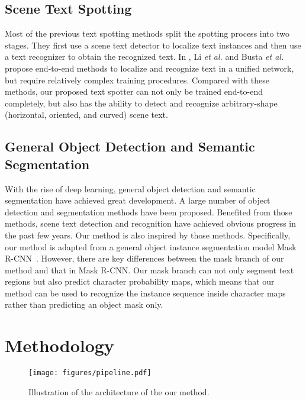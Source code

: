 \documentclass[runningheads]{llncs}
\begin{document}
\subsection{Scene Text Spotting}

Most of the previous text spotting methods \cite{jaderberg2016reading,liao2017textboxes,SynthText,liao2018textboxes++} split the spotting process into two stages. They first use a scene text detector \cite{jaderberg2016reading,liao2017textboxes,liao2018textboxes++} to localize text instances and then use a text recognizer \cite{Jaderberg14c,shi2017end} to obtain the recognized text. In \cite{Li_2017_ICCV,Busta_2017_ICCV}, Li \emph{et al.} and Busta \emph{et al.} propose end-to-end methods to localize and recognize text in a unified network, but require relatively complex training procedures. Compared with these methods, our proposed text spotter can not only be trained end-to-end completely, but also has the ability to detect and recognize  arbitrary-shape (horizontal, oriented, and curved) scene text.


\subsection{General Object Detection and Semantic Segmentation}

With the rise of deep learning, general object detection and semantic segmentation have achieved great development. A large number of object detection and segmentation  methods \cite{girshick2014rich,fastrcnn,ren2015faster,dai2016r,lin2017feature,liu2016ssd,redmon2016you,long2015fully,dai2016instance,li2017fully,he2017mask} have been proposed. Benefited from those methods, scene text detection and recognition have achieved obvious progress in the past few years. Our method is also inspired by those methods. Specifically, our method is adapted from a general object instance segmentation model Mask R-CNN~\cite{he2017mask}. However, there are key differences between the mask branch of our method and that in Mask R-CNN. Our mask branch can not only segment text regions but also predict character probability maps, which means that our method can be used to recognize the instance sequence inside character maps rather than predicting an object mask only.

\section{Methodology}
\begin{figure}[!b]
\begin{center}
\texttt{[image: figures/pipeline.pdf]}
\end{center}
\caption{Illustration of the architecture of the our method.}
\label{fig:pipeline}
\end{figure}
\end{document}
